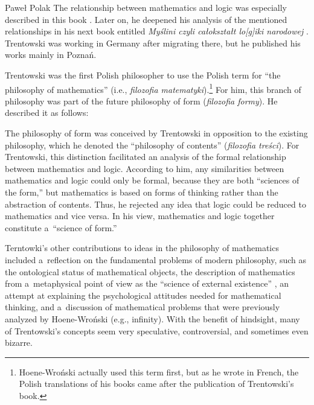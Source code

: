 \begin{artengenv}{Paweł Polak}
The relationship between mathematics and logic was especially described in this book
\parencite[][sec.51]{trentowski_chowanna_1842-1}. %
 Later on, he deepened his analysis of the mentioned relationships in his next book entitled \textit{Myślini czyli całokształt lo[g]iki narodowej} 
\parencites[][]{trentowski_myslini_1844-1}[][]{trentowski_chowanna_1842-1}. %
 Trentowski was working in Germany after migrating there, but he published his works mainly in Poznań.

Trentowski was the first Polish philosopher to use the Polish term for ``the philosophy of mathematics'' (i.e., \textit{filozofia matematyki}).\footnote{Hoene-Wroński actually used this term first, but as he wrote in French, the Polish translations of his books came after the publication of Trentowski's book.} For him, this branch of philosophy was part of the future philosophy of form (\textit{filozofia formy}). He described it as follows:

The philosophy of form was conceived by Trentowski in opposition to the existing philosophy, which he denoted the ``philosophy of contents'' (\textit{filozofia treści}). For Trentowski, this distinction facilitated an analysis of the formal relationship between mathematics and logic. According to him, any similarities between mathematics and logic could only be formal, because they are both ``sciences of the form,'' but mathematics is based on forms of thinking rather than the abstraction of contents. Thus, he rejected any idea that logic could be reduced to mathematics and vice versa. In his view, mathematics and logic together constitute a~``science of form.''

Terntowki's other contributions to ideas in the philosophy of mathematics included a~reflection on the fundamental problems of modern philosophy, such as the ontological status of mathematical objects, the description of mathematics from a~metaphysical point of view as the ``science of external existence''
\parencite[][p.324]{trentowski_chowanna_1842-1}, %
 an attempt at explaining the psychological attitudes needed for mathematical thinking, and a~discussion of mathematical problems that were previously analyzed by Hoene-Wroński (e.g., infinity). With the benefit of hindsight, many of Trentowski's concepts seem very speculative, controversial, and sometimes even bizarre.


\end{artengenv}
